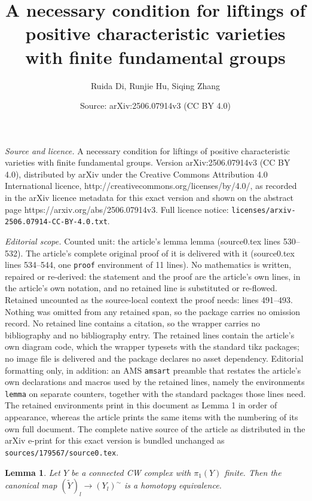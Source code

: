 \documentclass[10pt,a4paper]{amsart}
\title{A necessary condition for liftings of positive characteristic varieties with finite fundamental groups}
\author{Ruida Di, Runjie Hu, Siqing Zhang}
\date{Source: arXiv:2506.07914v3 (CC BY 4.0)}
\newtheorem{lemma}{Lemma}
\begin{document}
\maketitle

\noindent\emph{Source and licence.} A necessary condition for liftings of positive characteristic varieties with finite fundamental groups. Version arXiv:2506.07914v3 (CC BY 4.0), distributed by arXiv under the Creative Commons Attribution 4.0 International licence, http://creativecommons.org/licenses/by/4.0/, as recorded in the arXiv licence metadata for this exact version and shown on the abstract page https://arxiv.org/abs/2506.07914v3. Full licence notice: \texttt{licenses/arxiv-2506.07914-CC-BY-4.0.txt}.\par\smallskip

\noindent\textit{Editorial scope.} Counted unit: the article's lemma lemma (source0.tex lines 530--532). The article's complete original proof of it is delivered with it (source0.tex lines 534--544, one \texttt{proof} environment of 11 lines). No mathematics is written, repaired or re-derived: the statement and the proof are the article's own lines, in the article's own notation, and no retained line is substituted or re-flowed.  Retained uncounted as the source-local context the proof needs: lines 491--493.  Nothing was omitted from any retained span, so the package carries no omission record.  No retained line contains a citation, so the wrapper carries no bibliography and no bibliography entry.  The retained lines contain the article's own diagram code, which the wrapper typesets with the standard tikz packages; no image file is delivered and the package declares no asset dependency.  Editorial formatting only, in addition: an AMS \texttt{amsart} preamble that restates the article's own declarations and macros used by the retained lines, namely the environments \texttt{lemma} on separate counters, together with the standard packages those lines need.  The retained environments print in this document as Lemma 1 in order of appearance, whereas the article prints the same items with the numbering of its own full document.  The complete native source of the article as distributed in the arXiv e-print for this exact version is bundled unchanged as \texttt{sources/179567/source0.tex}.
\begin{lemma}\label{Lem: Commutativity of universal cover and l-completion}
Let $Y$ be a connected CW complex with $\pi_1(Y)$ finite. Then the canonical map $(\widetilde{Y})_l\rightarrow (Y_l)^{\sim}$ is a homotopy equivalence.
\end{lemma}
\end{document}
